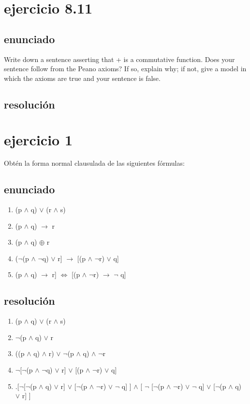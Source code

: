 \documentclass[a4paper,10pt]{article}
\begin{document}
\section{ejercicio 8.11}
\subsection{enunciado}
Write down a sentence asserting that + is a commutative function. Does your sentence follow from the Peano axioms? If so, explain why; if not, give a model in which the axioms are true and your sentence is false.
\subsection{resolución}


\pagebreak

\section{ejercicio 1}
Obtén la forma normal clausulada de las siguientes fórmulas:
\subsection{enunciado}
\begin{enumerate}
	\item (p $\land$ q) $\lor$ (r $\land$ s)
	\item (p $\land$ q) $\rightarrow$ r
	\item (p $\land$ q) $\oplus$ r
	\item ($\neg$(p $\land$ $\neg$q) $\lor$ r] $\rightarrow$ [(p  $\land$ $\neg$r) $\lor$ q]
	\item (p $\land$ q) $\rightarrow$ r] $\iff$ [(p $\land$ $\neg$r)  $\rightarrow$ $\neg$ q]

\end{enumerate}
\subsection{resolución}
\begin{enumerate}
	\item (p $\land$ q) $\lor$ (r $\land$ s)
	\item $\neg$(p $\land$ q) $\lor$ r
	\item ((p $\land$ q) $\land$ r) $\lor$ $\neg$(p $\land$ q) $\land$ $\neg$r
	\item $\neg$[$\neg$(p $\land$ $\neg$q) $\lor$ r] $\lor$ [(p  $\land$ $\neg$r) $\lor$ q]
	\item .[$\neg$[$\neg$(p $\land$ q) $\lor$ r] $\lor$ [$\neg$(p $\land$ $\neg$r)  $\lor$ $\neg$ q] ] $\land$ [ $\neg$ [$\neg$(p $\land$ $\neg$r)  $\lor$ $\neg$ q] $\lor$ [$\neg$(p $\land$ q) $\lor$ r] ]
\end{enumerate}
\end{document}
